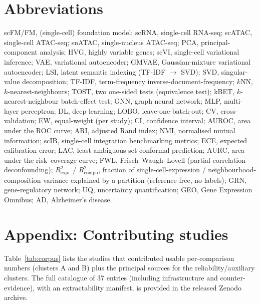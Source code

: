 \documentclass[fleqn,10pt,lineno]{wlpeerj}  %
\begin{document}
\section*{Abbreviations}
{\footnotesize\noindent scFM/FM, (single-cell) foundation model; scRNA, single-cell RNA-seq; scATAC, single-cell ATAC-seq; snATAC, single-nucleus ATAC-seq; PCA, principal-component analysis; HVG, highly variable genes; scVI, single-cell variational inference; VAE, variational autoencoder; GMVAE, Gaussian-mixture variational autoencoder; LSI, latent semantic indexing (TF-IDF $\to$ SVD); SVD, singular-value decomposition; TF-IDF, term-frequency inverse-document-frequency; $k$NN, $k$-nearest-neighbours; TOST, two one-sided tests (equivalence test); kBET, $k$-nearest-neighbour batch-effect test; GNN, graph neural network; MLP, multi-layer perceptron; DL, deep learning; LOBO, leave-one-batch-out; CV, cross-validation; EW, equal-weight (per study); CI, confidence interval; AUROC, area under the ROC curve; ARI, adjusted Rand index; NMI, normalised mutual information; scIB, single-cell integration benchmarking metrics; ECE, expected calibration error; LAC, least-ambiguous-set conformal prediction; AURC, area under the risk--coverage curve; FWL, Frisch--Waugh--Lovell (partial-correlation deconfounding); $R^2_{\mathrm{expr}}$ / $R^2_{\mathrm{compo}}$, fraction of single-cell-expression / neighbourhood-composition variance explained by a partition (reference-free, no labels); GRN, gene-regulatory network; UQ, uncertainty quantification; GEO, Gene Expression Omnibus; AD, Alzheimer's disease.\par}

\appendix
\renewcommand{\thetable}{A\arabic{table}}
\setcounter{table}{0}
\section*{Appendix: Contributing studies}
Table~\ref{tab:corpus} lists the studies that contributed usable per-comparison numbers (clusters A and B) plus the principal sources for the reliability/auxiliary clusters. The full catalogue of 37 entries (including infrastructure and counter-evidence), with an extractability manifest, is provided in the released Zenodo archive.
\end{document}
